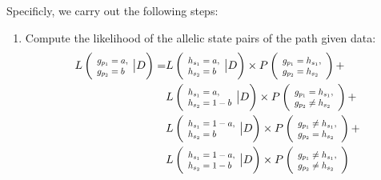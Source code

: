 \documentclass{bioinfo}
\newcommand*{\Scale}[2][4]{\scalebox{#1}{$#2$}}%
\begin{document}
Specificly, we carry out the following steps:
\begin{enumerate}
\item Compute the likelihood of the allelic state pairs of the path given data:
\begin{equation}
\begin{split}
L\left( \Scale[0.8]{ \begin{array}{l} g_{p_1} = a, \\g_{p_2} = b \end{array}} \big{|} D\right) = & L\left(\Scale[0.8]{\begin{array}{l}h_{s_1} = a,\\ h_{s_2} = b \end{array}} \big{|} D \right) \times P\left(\Scale[0.8]{\begin{array}{l}g_{p_1} = h_{s_1}, \\g_{p_2}= h_{s_2}\end{array}} \right)  + \\
                                         & L\left(\Scale[0.8]{\begin{array}{l}h_{s_1} = a, \\h_{s_2} = 1-b \end{array}} \big{|} D \right) \times P\left(\Scale[0.8]{\begin{array}{l}g_{p_1} = h_{s_1}, \\g_{p_2} \neq h_{s_2}\end{array}} \right)  + \\
                                         & L\left(\Scale[0.8]{\begin{array}{l}h_{s_1} = 1-a, \\h_{s_2} = b \end{array}} \big{|} D \right) \times P\left(\Scale[0.8]{\begin{array}{l}g_{p_1} \neq h_{s_1}, \\g_{p_2} = h_{s_2}\end{array}} \right)  + \\
                                         & L\left(\Scale[0.8]{\begin{array}{l}h_{s_1} = 1-a, \\h_{s_2} = 1-b \end{array}} \big{|} D \right) \times P\left(\Scale[0.8]{\begin{array}{l}g_{p_1} \neq h_{s_1}, \\g_{p_2} \neq h_{s_2}\end{array}} \right)
\end{split}\label{eqn:llk_given_D:two}

\end{equation}
\end{enumerate}
\end{document}
